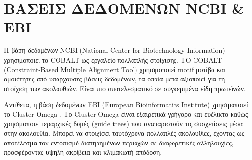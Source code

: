    \section{ΒΑΣΕΙΣ ΔΕΔΟΜΕΝΩΝ NCBI \& EBI}
        Η βάση δεδομένων NCBI (National Center for Biotechnology Information) \cite{NCBI} χρησιμοποιεί το COBALT \cite{COBALT} ως εργαλείο πολλαπλής στοίχισης.
        ΤΟ COBALT (Constraint-Based Multiple Alignment Tool) χρησιμοποιεί motif μοτίβα και ομοιότητες από υπάρχουσες βάσεις δεδομένων, τα οποία μετά αξιοποιεί για τη στοίχιση των ακολουθιών.
        Είναι πιο αποτελεσματικό σε συγκεριμένα είδη πρωτεϊνών.

        Αντίθετα, η βάση δεδομένων EBI \cite{EBI} (European Bioinformatics Institute) χρησιμοποιεί το Cluster Omega \cite{ClusterOmega}.
        Το Cluster Omega είναι εξαιρετικά γρήγορο και ευέλικτο καθώς χρησιμοποιεί ιεραρχικές δομές (guide trees) που αναπαριστούν τις συσχετίσεις μέσα στην ακολουθία.
        Μπορεί να στοιχίσει ταυτόχρονα πολλαπλές ακολουθίες, έχοντας ως αποτέλεσμα τον εντοπισμό διατηρημένων περιοχών σε διαφορετικές αλληλουχίες, προσφέροντας υψηλή ακρίβεια και κλιμακωτή απόδοση.